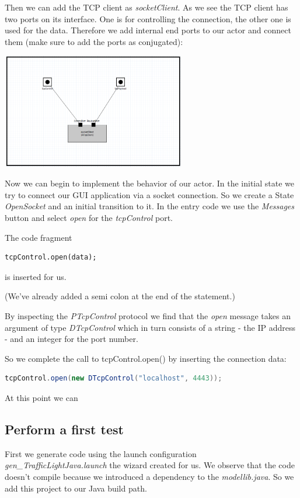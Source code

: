 Then we can add the TCP client as \textit{socketClient}.
As we see the TCP client has two ports on its interface. One is for controlling the connection, the other one
is used for the data. Therefore we add internal end ports to our actor and connect them
(make sure to add the ports as conjugated):

\includegraphics[width=0.6\textwidth]{images/018-socketSvc.png}

Now we can begin to implement the behavior of our actor.
In the initial state we try to connect our GUI application via a socket connection.
So we create a State \textit{OpenSocket} and an initial transition to it.
In the entry code we use the \textit{Messages} button and select \textit{open} for the \textit{tcpControl} port.

The code fragment
\begin{lstlisting}[language=ROOM]
tcpControl.open(data);
\end{lstlisting}
is inserted for us.

(We've already added a semi colon at the end of the statement.)

By inspecting the \textit{PTcpControl} protocol we find that the \textit{open} message takes an argument
of type \textit{DTcpControl} which in turn consists of a string - the IP address - and an integer for the
port number.

So we complete the call to tcpControl.open() by inserting the connection data:
\begin{lstlisting}[language=Java]
tcpControl.open(new DTcpControl("localhost", 4443));
\end{lstlisting}

At this point we can

\subsection{Perform a first test}

First we generate code using the launch configuration \textit{gen\_TrafficLightJava.launch} the wizard created for us.
We observe that the code doesn't compile because we introduced a dependency to the \textit{modellib.java}.
So we add this project to our Java build path.

